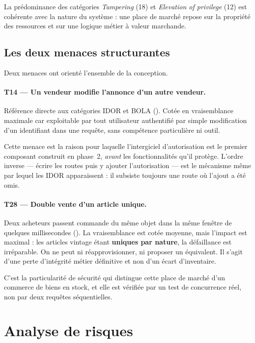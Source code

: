 La prédominance des catégories \emph{Tampering} (18) et \emph{Elevation of
privilege} (12) est cohérente avec la nature du système : une place de marché
repose sur la propriété des ressources et sur une logique métier à valeur
marchande.

\subsection{Les deux menaces structurantes}

Deux menaces ont orienté l'ensemble de la conception.

\paragraph{T14 --- Un vendeur modifie l'annonce d'un autre vendeur.}
Référence directe aux catégories IDOR et BOLA (). Cotée en
vraisemblance maximale car exploitable par tout utilisateur authentifié par
simple modification d'un identifiant dans une requête, sans compétence
particulière ni outil.

Cette menace est la raison pour laquelle l'intergiciel d'autorisation est le
premier composant construit en phase~2, \emph{avant} les fonctionnalités qu'il
protège. L'ordre inverse --- écrire les routes puis y ajouter l'autorisation ---
est le mécanisme même par lequel les IDOR apparaissent : il subsiste toujours
une route où l'ajout a été omis.

\paragraph{T28 --- Double vente d'un article unique.}
Deux acheteurs passent commande du même objet dans la même fenêtre de quelques
millisecondes (). La vraisemblance est cotée moyenne, mais l'impact
est maximal : les articles vintage étant \textbf{uniques par nature}, la
défaillance est irréparable. On ne peut ni réapprovisionner, ni proposer un
équivalent. Il s'agit d'une perte d'intégrité métier définitive et non d'un
écart d'inventaire.

C'est la particularité de sécurité qui distingue cette place de marché d'un
commerce de biens en stock, et elle est vérifiée par un test de concurrence
réel, non par deux requêtes séquentielles.

\section{Analyse de risques}

